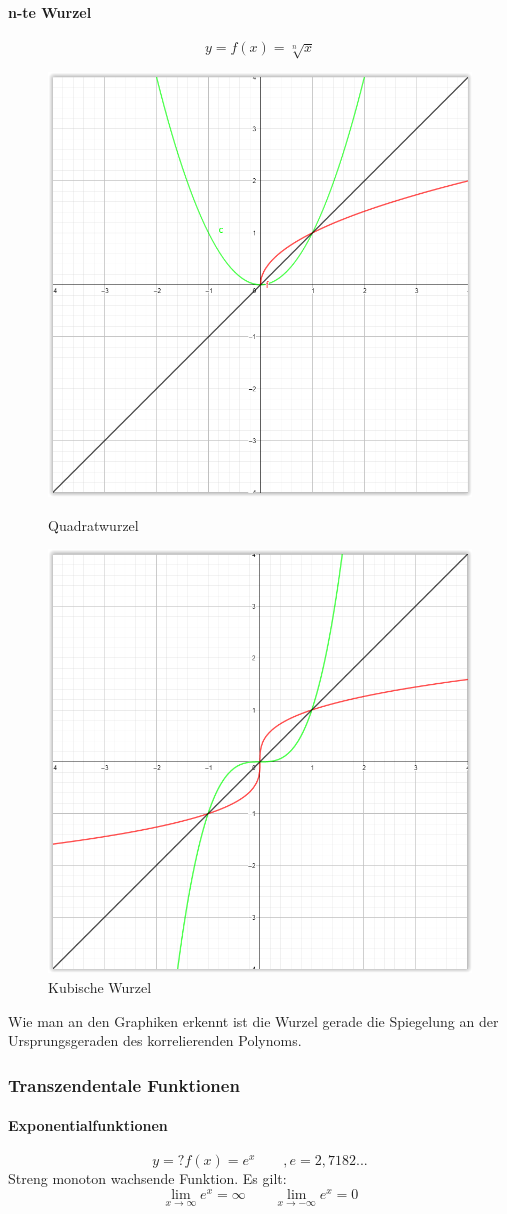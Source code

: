 \documentclass[12pt,a4paper]{report}%
\numberwithin{equation}{section}
\newcommand{\subsubsubsection}{\paragraph}
\numberwithin{equation}{subsection}
\begin{document}
		\subsubsubsection{n-te Wurzel}
		\begin{equation}
		  y = f(x) = \sqrt[n]{x}
		\end{equation}
		\begin{figure}[H] 
		\centering
		\begin{minipage}{.5\textwidth}
		  \centering
		  \includegraphics[width=0.6\linewidth]{funktionen_wurzel_2.png}
		  \caption{Quadratwurzel}
		  \label{fig:funkt_root_1}
		\end{minipage}%
		\begin{minipage}{.5\textwidth}
		  \centering
		  \includegraphics[width=0.6\linewidth]{funktionen_wurzel_3.png}
		  \caption{Kubische Wurzel}
		  \label{fig:funkt_root_2}
		\end{minipage}
		\end{figure}
		Wie man an den Graphiken erkennt ist die Wurzel gerade die Spiegelung an der Ursprungsgeraden des korrelierenden Polynoms. 
		
		\subsubsection{Transzendentale Funktionen}
		\subsubsubsection{Exponentialfunktionen}
		\begin{equation}
		  y =? f(x) = e^x \qquad, e = 2,7182...
		\end{equation}
		Streng monoton wachsende Funktion. Es gilt:
		\begin{equation}
		  \lim_{x\rightarrow \infty} e^x = \infty \qquad \lim_{x\rightarrow -\infty} e^x = 0
		\end{equation}
		
\end{document}
